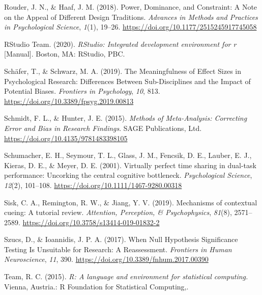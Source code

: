 \documentclass[
  man]{apa6}
\newlength{\cslhangindent}
\newlength{\cslentryspacingunit} %
\newenvironment{CSLReferences}[2] %
 {%
  \setlength{\parindent}{0pt}
  \ifodd #1
  \let\oldpar\par
  \def\par{\hangindent=\cslhangindent\oldpar}
  \fi
  \setlength{\parskip}{#2\cslentryspacingunit}
 }%
 {}
\begin{document}
\begin{CSLReferences}{1}{0}
\leavevmode{}%
Rouder, J. N., \& Haaf, J. M. (2018). Power, {Dominance}, and {Constraint}: {A Note} on the {Appeal} of {Different Design Traditions}. \emph{Advances in Methods and Practices in Psychological Science}, \emph{1}(1), 19--26. \url{https://doi.org/10.1177/2515245917745058}

\leavevmode{}%
RStudio Team. (2020). \emph{{RStudio}: {Integrated} development environment for r} {[}Manual{]}. {Boston, MA}: {RStudio, PBC.}

\leavevmode{}%
Schäfer, T., \& Schwarz, M. A. (2019). The {Meaningfulness} of {Effect Sizes} in {Psychological Research}: {Differences Between Sub-Disciplines} and the {Impact} of {Potential Biases}. \emph{Frontiers in Psychology}, \emph{10}, 813. \url{https://doi.org/10.3389/fpsyg.2019.00813}

\leavevmode{}%
Schmidt, F. L., \& Hunter, J. E. (2015). \emph{Methods of {Meta-Analysis}: {Correcting Error} and {Bias} in {Research Findings}}. {SAGE Publications, Ltd}. \url{https://doi.org/10.4135/9781483398105}

\leavevmode{}%
Schumacher, E. H., Seymour, T. L., Glass, J. M., Fencsik, D. E., Lauber, E. J., Kieras, D. E., \& Meyer, D. E. (2001). Virtually perfect time sharing in dual-task performance: Uncorking the central cognitive bottleneck. \emph{Psychological Science}, \emph{12}(2), 101--108. \url{https://doi.org/10.1111/1467-9280.00318}

\leavevmode{}%
Sisk, C. A., Remington, R. W., \& Jiang, Y. V. (2019). Mechanisms of contextual cueing: {A} tutorial review. \emph{Attention, Perception, \& Psychophysics}, \emph{81}(8), 2571--2589. \url{https://doi.org/10.3758/s13414-019-01832-2}

\leavevmode{}%
Szucs, D., \& Ioannidis, J. P. A. (2017). When {Null Hypothesis Significance Testing Is Unsuitable} for {Research}: {A Reassessment}. \emph{Frontiers in Human Neuroscience}, \emph{11}, 390. \url{https://doi.org/10.3389/fnhum.2017.00390}

\leavevmode{}%
Team, R. C. (2015). \emph{R: {A} language and environment for statistical computing.} {Vienna, Austria.}: R Foundation for Statistical Computing,.


\end{CSLReferences}
\end{document}
